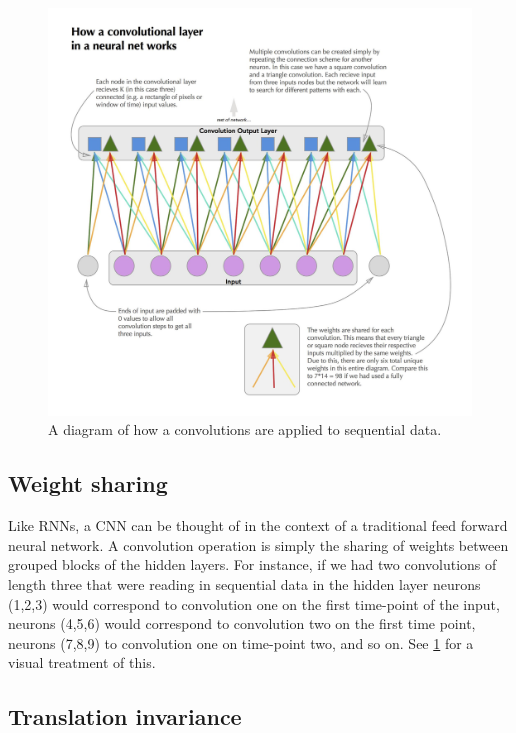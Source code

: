 \documentclass[]{book}
\theoremstyle{definition}
\theoremstyle{definition}
\theoremstyle{definition}
\theoremstyle{remark}
\begin{document}
\begin{figure}
\includegraphics[width=1\linewidth]{figures/convolutional_explainer} \caption{A diagram of how a convolutions are applied to sequential data.}\label{fig:cnnexplain}
\end{figure}

\subsection{Weight sharing}\label{weight-sharing-1}

Like RNNs, a CNN can be thought of in the context of a traditional feed
forward neural network. A convolution operation is simply the sharing of
weights between grouped blocks of the hidden layers. For instance, if we
had two convolutions of length three that were reading in sequential
data in the hidden layer neurons (1,2,3) would correspond to convolution
one on the first time-point of the input, neurons (4,5,6) would
correspond to convolution two on the first time point, neurons (7,8,9)
to convolution one on time-point two, and so on. See
\ref{fig:cnnexplain} for a visual treatment of this.

\subsection{Translation invariance}\label{translation-invariance}
\end{document}
